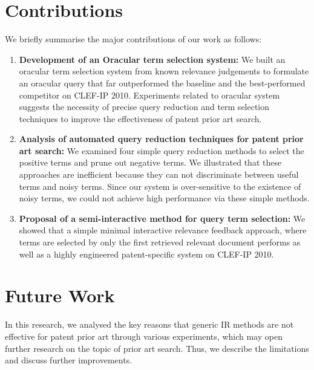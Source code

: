 \section{Contributions}
\label{sec:contributions}
We briefly summarise the major contributions of our work as follows:
\begin{enumerate}
\item \textbf{Development of an Oracular term selection system: }We built an oracular term selection system from known relevance judgements to formulate an oracular query that far outperformed the baseline and the best-performed competitor on CLEF-IP 2010. 
Experiments related to oracular system suggests the necessity of precise query
reduction and term selection techniques to improve the effectiveness of patent
prior art search.
\item \textbf{Analysis of automated query reduction techniques for patent prior art search: } We examined four simple query reduction methods to select the positive terms and prune out negative terms. We illustrated that these approaches are inefficient because they can not discriminate between useful terms and noisy terms. Since our system is over-sensitive to the existence of noisy terms, we could not achieve high performance via these simple methods. 
\item \textbf{Proposal of a semi-interactive method for query term selection: }We showed that a simple minimal interactive relevance feedback approach, where terms are selected by only the first retrieved relevant document performs as well as a highly engineered patent-specific system on CLEF-IP 2010. 
\end{enumerate}

\section{Future Work}
\label{sec:future}
In this research, we analysed the key reasons that generic IR methods are not effective for patent prior art through various experiments, which may open further research on the topic of prior art search. Thus, we describe the limitations and discuss further improvements.
